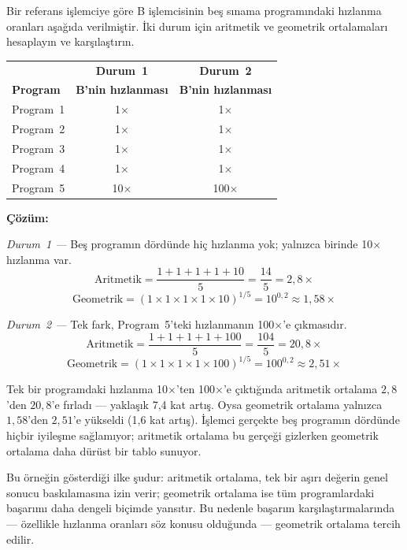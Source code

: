 \begin{ornek}[2.7]
Bir referans işlemciye göre B işlemcisinin beş sınama programındaki hızlanma oranları aşağıda verilmiştir. İki durum için aritmetik ve geometrik ortalamaları hesaplayın ve karşılaştırın.

\begin{center}
\small
\begin{tabular}{lcc}
\toprule
 & \textbf{Durum~1} & \textbf{Durum~2} \\
\textbf{Program} & \textbf{B'nin hızlanması} & \textbf{B'nin hızlanması} \\
\midrule
Program~1 & 1$\times$ & 1$\times$ \\
Program~2 & 1$\times$ & 1$\times$ \\
Program~3 & 1$\times$ & 1$\times$ \\
Program~4 & 1$\times$ & 1$\times$ \\
Program~5 & 10$\times$ & 100$\times$ \\
\bottomrule
\end{tabular}
\end{center}

\textbf{Çözüm:}

\emph{Durum~1 ---} Beş programın dördünde hiç hızlanma yok; yalnızca birinde 10$\times$ hızlanma var.
\[
\text{Aritmetik} = \frac{1+1+1+1+10}{5} = \frac{14}{5} = 2{,}8\times
\]
\[
\text{Geometrik} = (1 \times 1 \times 1 \times 1 \times 10)^{1/5} = 10^{0{,}2} \approx 1{,}58\times
\]

\emph{Durum~2 ---} Tek fark, Program~5'teki hızlanmanın 100$\times$'e çıkmasıdır.
\[
\text{Aritmetik} = \frac{1+1+1+1+100}{5} = \frac{104}{5} = 20{,}8\times
\]
\[
\text{Geometrik} = (1 \times 1 \times 1 \times 1 \times 100)^{1/5} = 100^{0{,}2} \approx 2{,}51\times
\]

Tek bir programdaki hızlanma 10$\times$'ten 100$\times$'e çıktığında aritmetik ortalama $2{,}8$'den $20{,}8$'e fırladı --- yaklaşık 7,4 kat artış. Oysa geometrik ortalama yalnızca $1{,}58$'den $2{,}51$'e yükseldi (1,6 kat artış). İşlemci gerçekte beş programın dördünde hiçbir iyileşme sağlamıyor; aritmetik ortalama bu gerçeği gizlerken geometrik ortalama daha dürüst bir tablo sunuyor.
\end{ornek}

Bu örneğin gösterdiği ilke şudur: aritmetik ortalama, tek bir aşırı değerin genel sonucu baskılamasına izin verir; geometrik ortalama ise tüm programlardaki başarımı daha dengeli biçimde yansıtır. Bu nedenle başarım karşılaştırmalarında --- özellikle hızlanma oranları söz konusu olduğunda --- geometrik ortalama tercih edilir.

